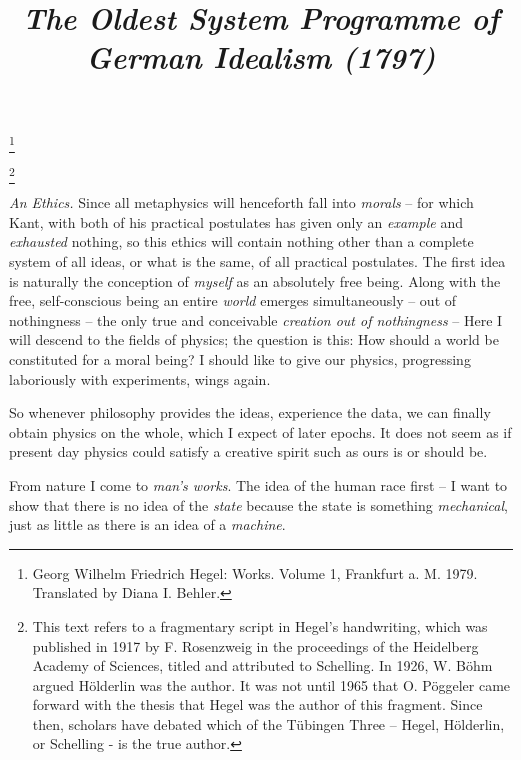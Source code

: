 \documentclass[12pt,letterpaper]{article} %
\newcommand\blfootnote[1]{%
  \begingroup
  \renewcommand\thefootnote{}\footnote{#1}%
  \addtocounter{footnote}{-1}%
  \endgroup
}
\begin{document}
\pagestyle{empty} %
\title{\textbf{\textit{\large The Oldest System Programme of German Idealism (1797)}}}
\date{} %

\maketitle
\thispagestyle{empty}

\blfootnote{Georg Wilhelm Friedrich Hegel: Works. Volume 1, Frankfurt a. M. 1979. Translated by Diana I. Behler.}
\blfootnote{This text refers to a fragmentary script in Hegel's handwriting, which was published in 1917 by F. Rosenzweig in the proceedings of the Heidelberg Academy of Sciences, titled and attributed to Schelling. In 1926, W. Böhm argued Hölderlin was the author. It was not until 1965 that O. Pöggeler came forward with the thesis that Hegel was the author of this fragment. Since then, scholars have debated which of the Tübingen Three – Hegel, Hölderlin, or Schelling - is the true author.}

\textit{An Ethics.} Since all metaphysics will henceforth fall into \textit{morals} -- for which Kant,
with both of his practical postulates has given only an \textit{example} and \textit{exhausted} nothing, so this
ethics will contain nothing other than a complete system of all ideas, or what is the same, of
all practical postulates. The first idea is naturally the conception of \textit{myself} as an absolutely
free being. Along with the free, self-conscious being an entire \textit{world} emerges
simultaneously -- out of nothingness -- the only true and conceivable \textit{creation out of
nothingness} -- Here I will descend to the fields of physics; the question is this: How should a
world be constituted for a moral being? I should like to give our physics, progressing
laboriously with experiments, wings again.

So whenever philosophy provides the ideas, experience the data, we can finally obtain
physics on the whole, which I expect of later epochs. It does not seem as if present day
physics could satisfy a creative spirit such as ours is or should be.

From nature I come to \textit{man's works}. The idea of the human race first -- I want to show
that there is no idea of the \textit{state} because the state is something \textit{mechanical}, just as little as
there is an idea of a \textit{machine}.
\end{document}
